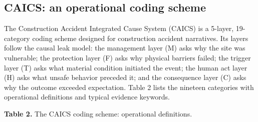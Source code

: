 \documentclass[11pt]{article}
\begin{document}
\subsection{CAICS: an operational coding scheme}
The Construction Accident Integrated Cause System (CAICS) is a 5-layer, 19-category coding scheme designed for construction accident narratives. Its layers follow the causal leak model: the management layer (M) asks why the site was vulnerable; the protection layer (F) asks why physical barriers failed; the trigger layer (T) asks what material condition initiated the event; the human act layer (H) asks what unsafe behavior preceded it; and the consequence layer (C) asks why the outcome exceeded expectation. Table 2 lists the nineteen categories with operational definitions and typical evidence keywords.

\textbf{Table 2.} The CAICS coding scheme: operational definitions.
\end{document}
